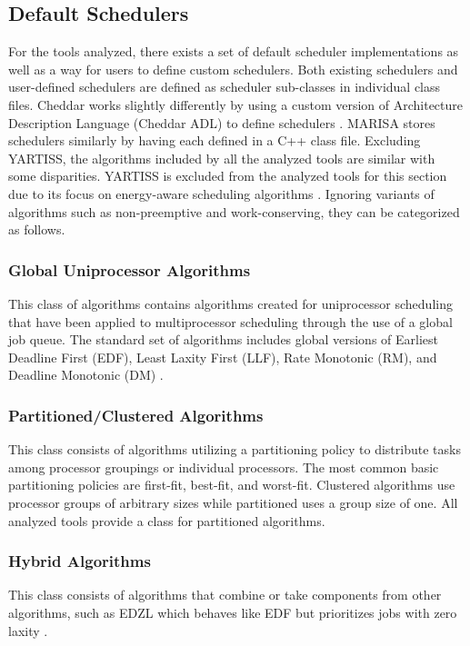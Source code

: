 \documentclass[conference,compsoc]{IEEEtran}
\begin{document}
\subsection{Default Schedulers}
For the tools analyzed, there exists a set of default scheduler implementations as well as a way for users to define custom schedulers. Both existing schedulers and user-defined schedulers are defined as scheduler sub-classes in individual class files. Cheddar works slightly differently by using a custom version of Architecture Description Language (Cheddar ADL) to define schedulers \cite{cheddar_docs}. MARISA stores schedulers similarly by having each defined in a C++ class file. Excluding YARTISS, the algorithms included by all the analyzed tools are similar with some disparities. YARTISS is excluded from the analyzed tools for this section due to its focus on energy-aware scheduling algorithms \cite{yartiss_docs}. Ignoring variants of algorithms such as non-preemptive and work-conserving, they can be categorized as follows.

\subsubsection{Global Uniprocessor Algorithms}
This class of algorithms contains algorithms created for uniprocessor scheduling that have been applied to multiprocessor scheduling through the use of a global job queue. The standard set of algorithms includes global versions of Earliest Deadline First (EDF), Least Laxity First (LLF), Rate Monotonic (RM), and Deadline Monotonic (DM) \cite{cheddar_docs, mcrtsim_repo, simso_repo}.

\subsubsection{Partitioned/Clustered Algorithms}
This class consists of algorithms utilizing a partitioning policy to distribute tasks among processor groupings or individual processors. The most common basic partitioning policies are first-fit, best-fit, and worst-fit. Clustered algorithms use processor groups of arbitrary sizes while partitioned uses a group size of one. All analyzed tools provide a class for partitioned algorithms.

\subsubsection{Hybrid Algorithms}
This class consists of algorithms that combine or take components from other algorithms, such as EDZL which behaves like EDF but prioritizes jobs with zero laxity \cite{edzl}.
\end{document}

